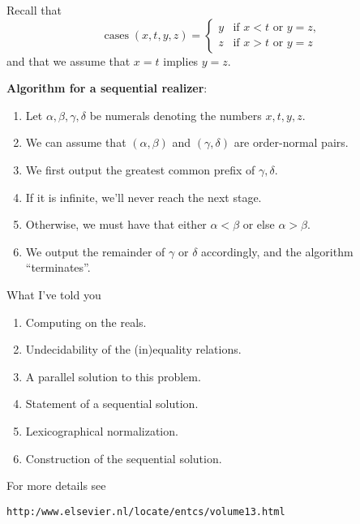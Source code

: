 \documentclass{csslides-1.1}
\newcommand{\Cases}{\operatorname{cases}}
\begin{document}
\begin{slide}{}
  
Recall that
\[
\Cases(x,t,y,z) = \begin{cases}
                    y & \text{if $x < t$ or $y=z$,} \\
                    z & \text{if $x > t$ or $y=z$}
                    \end{cases}
\]
and that we assume that $x = t$ implies $y=z$.

\vfill

{\bf Algorithm for a sequential realizer}:
\begin{enumerate}
\item Let $\alpha,\beta,\gamma,\delta$ be numerals denoting the numbers
$x,t,y,z$.


\item
We can assume that $(\alpha,\beta)$ and $(\gamma,\delta)$ are
order-normal pairs.

\item
We first output the greatest common prefix of $\gamma,\delta$.


\item
If it is infinite, we'll never reach the next stage.

\item
Otherwise, we must have that either $\alpha<\beta$ or else $\alpha >
\beta$.


\item
We output the remainder of $\gamma$ or $\delta$ accordingly, and the
algorithm ``terminates''.
\end{enumerate}

\end{slide}


\begin{slide}{What I've told you}

\begin{enumerate}
\item Computing on the reals.

\item Undecidability of the (in)equality relations.

\item A parallel solution to this problem.

\item Statement of a sequential solution.

\item Lexicographical normalization.

\item Construction of the sequential solution.
\end{enumerate}

\vfill

For more details see

\begin{small}
{\tt http:/www.elsevier.nl/locate/entcs/volume13.html}
\end{small}

\vfill

\begin{center}
\end{center}

\vfill

\end{slide}
\end{document}
